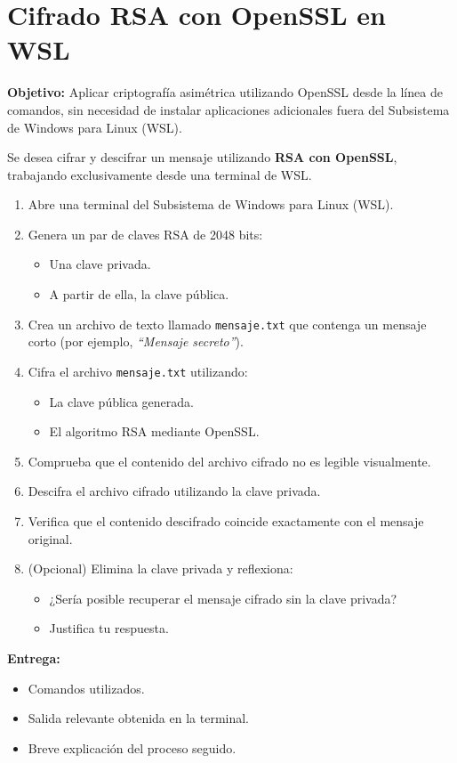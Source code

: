 \documentclass{article}
\begin{document}
\section{Cifrado RSA con OpenSSL en WSL}

\textbf{Objetivo:} Aplicar criptografía asimétrica utilizando OpenSSL desde la línea de comandos, sin necesidad de instalar aplicaciones adicionales fuera del Subsistema de Windows para Linux (WSL).

\bigskip

Se desea cifrar y descifrar un mensaje utilizando \textbf{RSA con OpenSSL}, trabajando exclusivamente desde una terminal de WSL.

\begin{enumerate}
    \item Abre una terminal del Subsistema de Windows para Linux (WSL).

    \item Genera un par de claves RSA de 2048 bits:
    \begin{itemize}
        \item Una clave privada.
        \item A partir de ella, la clave pública.
    \end{itemize}

    \item Crea un archivo de texto llamado \texttt{mensaje.txt} que contenga un mensaje corto (por ejemplo, \emph{``Mensaje secreto''}).

    \item Cifra el archivo \texttt{mensaje.txt} utilizando:
    \begin{itemize}
        \item La clave pública generada.
        \item El algoritmo RSA mediante OpenSSL.
    \end{itemize}

    \item Comprueba que el contenido del archivo cifrado no es legible visualmente.

    \item Descifra el archivo cifrado utilizando la clave privada.

    \item Verifica que el contenido descifrado coincide exactamente con el mensaje original.

    \item (Opcional) Elimina la clave privada y reflexiona:
    \begin{itemize}
        \item ¿Sería posible recuperar el mensaje cifrado sin la clave privada?
        \item Justifica tu respuesta.
    \end{itemize}
\end{enumerate}

\bigskip

\textbf{Entrega:}
\begin{itemize}
    \item Comandos utilizados.
    \item Salida relevante obtenida en la terminal.
    \item Breve explicación del proceso seguido.
\end{itemize}
\end{document}
